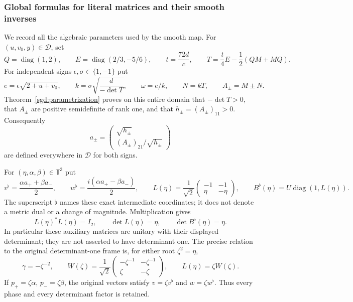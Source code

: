 \subsubsection{Global formulas for literal matrices and their smooth inverses}

We record all the algebraic parameters used by the smooth map.
For $(u,v_0,y)\in\mathcal D$, set
\[
 Q=\operatorname{diag}(1,2),\qquad E=\operatorname{diag}(2/3,-5/6),
 \qquad t=\frac{72d}{c},\qquad
 T=\frac t4E-\frac12(QM+MQ).
\]
For independent signs $\epsilon,\sigma\in\{1,-1\}$ put
\[
 e=\epsilon\sqrt{2+u+v_0},\qquad
 k=\sigma\sqrt{\frac d{-\det T}},\qquad
 \omega=e/k,\qquad N=kT,\qquad A_\pm=M\pm N.
\]
Theorem~\ref{sgd:parametrization} proves on this entire domain that
$-\det T>0$, that $A_\pm$ are positive semidefinite of rank one,
and that $h_\pm=(A_\pm)_{11}>0$. Consequently
\[
 a_\pm=\begin{pmatrix}\sqrt{h_\pm}\\
                 (A_\pm)_{21}/\sqrt{h_\pm}\end{pmatrix}
\]
are defined everywhere in $\mathcal D$ for both signs.

For $(\eta,\alpha,\beta)\in\mathbb T^3$ put
\[
 v^\flat=\frac{\alpha a_++\beta a_-}{2},\qquad
 w^\flat=\frac{i(\alpha a_+-\beta a_-)}{2},\qquad
 L(\eta)=\frac1{\sqrt2}\begin{pmatrix}-1&-1\\\eta&-\eta\end{pmatrix},
 \qquad B^\flat(\eta)=U\operatorname{diag}(1,L(\eta)).
\]
The superscript $\flat$ names these exact intermediate coordinates;
it does not denote a metric dual or a change of magnitude.
Multiplication gives
\[
 L(\eta)^*L(\eta)=I_2,\qquad
 \det L(\eta)=\eta,\qquad \det B^\flat(\eta)=\eta.
\]
In particular these auxiliary matrices are unitary with their
displayed determinant; they are not asserted to have determinant one.
The precise relation to the original determinant-one frame is,
for either root $\zeta^2=\eta$,
\[
 \gamma=-\zeta^{-2},\qquad
 W(\zeta)=\frac1{\sqrt2}
 \begin{pmatrix}-\zeta^{-1}&-\zeta^{-1}\\\zeta&-\zeta\end{pmatrix},
 \qquad L(\eta)=\zeta W(\zeta).
\]
If $p_+=\zeta\alpha$, $p_-=\zeta\beta$, the original vectors satisfy
$v=\zeta v^\flat$ and $w=\zeta w^\flat$.
Thus every phase and every determinant factor is retained.

